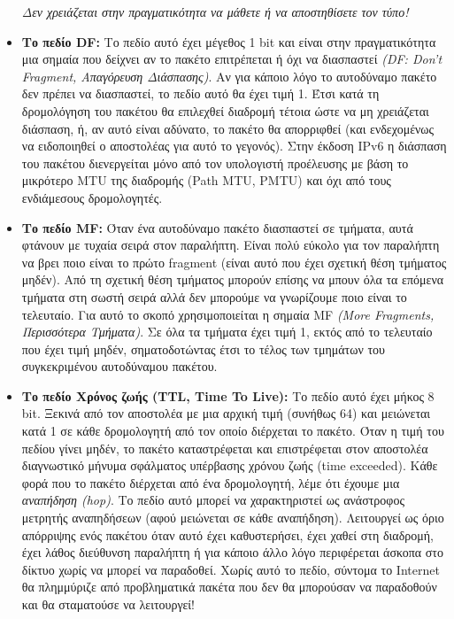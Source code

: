 \begin{itemize}
\emph{Δεν χρειάζεται στην πραγματικότητα να μάθετε ή να αποστηθίσετε τον τύπο!}

\item \textbf{Το πεδίο DF:} Το πεδίο αυτό έχει μέγεθος 1 bit και είναι στην πραγματικότητα μια σημαία που δείχνει αν το πακέτο επιτρέπεται ή όχι να διασπαστεί \emph{(DF: Don't Fragment, Απαγόρευση Διάσπασης)}. Αν για κάποιο λόγο το αυτοδύναμο πακέτο δεν πρέπει να διασπαστεί, το πεδίο αυτό θα έχει τιμή 1.  Έτσι κατά τη δρομολόγηση του πακέτου θα επιλεχθεί διαδρομή τέτοια ώστε να μη χρειάζεται διάσπαση, ή, αν αυτό είναι αδύνατο, το πακέτο θα απορριφθεί (και ενδεχομένως να ειδοποιηθεί ο αποστολέας για αυτό το γεγονός). Στην έκδοση IPv6 η διάσπαση του πακέτου διενεργείται μόνο από τον υπολογιστή προέλευσης με βάση το μικρότερο MTU της διαδρομής (Path MTU, PMTU) και όχι από τους ενδιάμεσους δρομολογητές. 
 
\item \textbf{Το πεδίο MF:} Όταν ένα αυτοδύναμο πακέτο διασπαστεί σε τμήματα, αυτά φτάνουν με τυχαία σειρά στον παραλήπτη. Είναι πολύ εύκολο για τον παραλήπτη να βρει ποιο είναι το πρώτο fragment (είναι αυτό που έχει σχετική θέση τμήματος μηδέν). Από τη σχετική θέση τμήματος μπορούν επίσης να μπουν όλα τα επόμενα τμήματα στη σωστή σειρά αλλά δεν μπορούμε να γνωρίζουμε ποιο είναι το τελευταίο. Για αυτό το σκοπό χρησιμοποιείται η σημαία MF \emph{(More Fragments, Περισσότερα Τμήματα)}. Σε όλα τα τμήματα έχει τιμή 1, εκτός από το τελευταίο που έχει τιμή μηδέν, σηματοδοτώντας έτσι το τέλος των τμημάτων του συγκεκριμένου αυτοδύναμου πακέτου.

\item \textbf{Το πεδίο Χρόνος ζωής (TTL, Time To Live):} Το πεδίο αυτό έχει μήκος 8 bit. Ξεκινά από τον αποστολέα με μια αρχική τιμή (συνήθως 64) και μειώνεται κατά 1 σε κάθε δρομολογητή από τον οποίο διέρχεται το πακέτο. Όταν η τιμή του πεδίου γίνει μηδέν, το πακέτο καταστρέφεται και επιστρέφεται στον αποστολέα διαγνωστικό μήνυμα σφάλματος υπέρβασης χρόνου ζωής (time exceeded). Κάθε φορά που το πακέτο διέρχεται από ένα δρομολογητή, λέμε ότι έχουμε μια \emph{αναπήδηση (hop)}. Το πεδίο αυτό μπορεί να χαρακτηριστεί ως ανάστροφος μετρητής αναπηδήσεων (αφού μειώνεται σε κάθε αναπήδηση). Λειτουργεί ως όριο απόρριψης ενός πακέτου όταν αυτό έχει καθυστερήσει, έχει χαθεί στη διαδρομή, έχει λάθος διεύθυνση παραλήπτη ή για κάποιο άλλο λόγο περιφέρεται άσκοπα στο δίκτυο χωρίς να μπορεί να παραδοθεί. Χωρίς αυτό το πεδίο, σύντομα το Internet θα πλημμύριζε από προβληματικά πακέτα που δεν θα μπορούσαν να παραδοθούν και θα σταματούσε να λειτουργεί!


\end{itemize}
